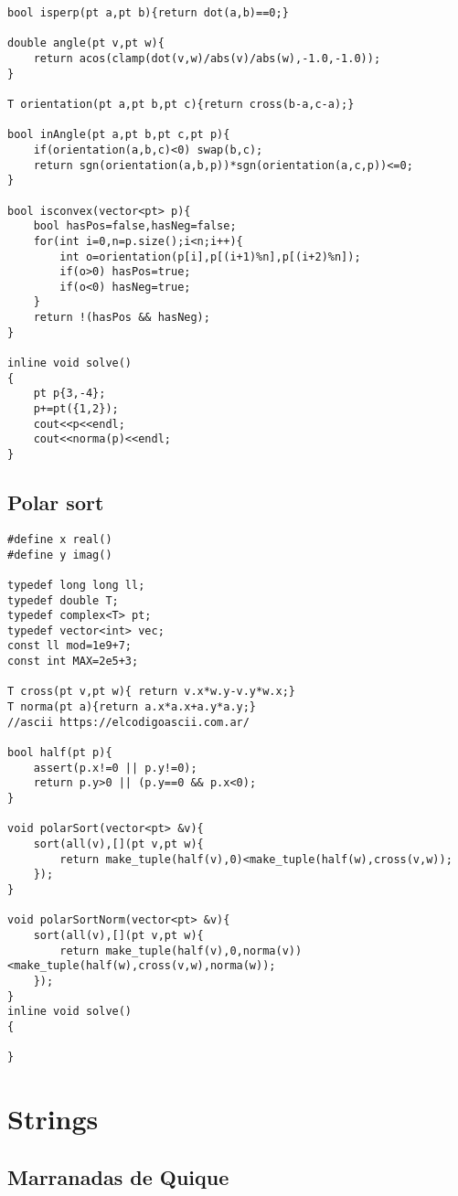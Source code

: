 \documentclass[10pt]{article}
\begin{document}
\begin{multicols*}{2}
\begin{lstlisting}
bool isperp(pt a,pt b){return dot(a,b)==0;}

double angle(pt v,pt w){
    return acos(clamp(dot(v,w)/abs(v)/abs(w),-1.0,-1.0));
}

T orientation(pt a,pt b,pt c){return cross(b-a,c-a);}

bool inAngle(pt a,pt b,pt c,pt p){
    if(orientation(a,b,c)<0) swap(b,c);
    return sgn(orientation(a,b,p))*sgn(orientation(a,c,p))<=0;
}

bool isconvex(vector<pt> p){
    bool hasPos=false,hasNeg=false;
    for(int i=0,n=p.size();i<n;i++){
        int o=orientation(p[i],p[(i+1)%n],p[(i+2)%n]);
        if(o>0) hasPos=true;
        if(o<0) hasNeg=true;
    }
    return !(hasPos && hasNeg);
}

inline void solve()
{
    pt p{3,-4};
    p+=pt({1,2});
    cout<<p<<endl;
    cout<<norma(p)<<endl;
}
\end{lstlisting}

\subsection{Polar sort}

\begin{lstlisting}[style=compactcpp]
#define x real() 
#define y imag()
 
typedef long long ll;
typedef double T;
typedef complex<T> pt;
typedef vector<int> vec;
const ll mod=1e9+7;
const int MAX=2e5+3;

T cross(pt v,pt w){ return v.x*w.y-v.y*w.x;}
T norma(pt a){return a.x*a.x+a.y*a.y;}
//ascii https://elcodigoascii.com.ar/

bool half(pt p){
    assert(p.x!=0 || p.y!=0);
    return p.y>0 || (p.y==0 && p.x<0);
}

void polarSort(vector<pt> &v){
    sort(all(v),[](pt v,pt w){
        return make_tuple(half(v),0)<make_tuple(half(w),cross(v,w));
    });
}

void polarSortNorm(vector<pt> &v){
    sort(all(v),[](pt v,pt w){
        return make_tuple(half(v),0,norma(v))<make_tuple(half(w),cross(v,w),norma(w));
    });
}
inline void solve()
{

}
\end{lstlisting}

\section{Strings}

\subsection{Marranadas de Quique}
\begin{lstlisting}[style=compactcpp]


\end{lstlisting}
\end{multicols*}
\end{document}
